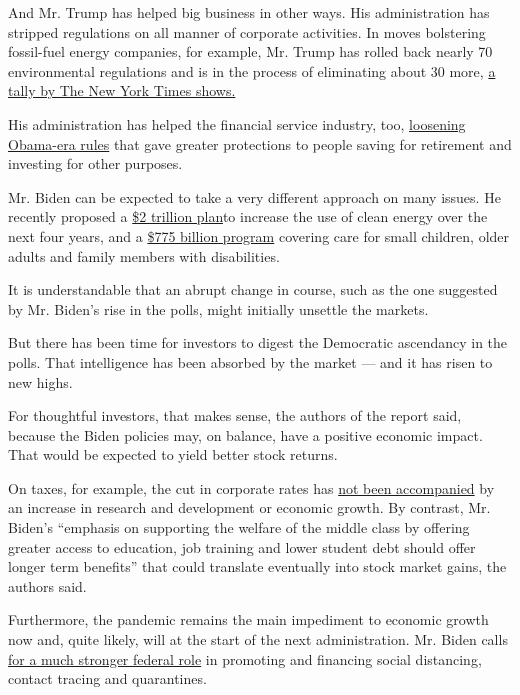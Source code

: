 And Mr. Trump has helped big business in other ways. His administration
has stripped regulations on all manner of corporate activities. In moves
bolstering fossil-fuel energy companies, for example, Mr. Trump has
rolled back nearly 70 environmental regulations and is in the process of
eliminating about 30 more,
\href{https://www.nytimes.com/interactive/2020/climate/trump-environment-rollbacks.html}{a
tally by The New York Times shows.}

His administration has helped the financial service industry, too,
\href{https://www.nytimes.com/2020/07/16/your-money/fiduciary-duty-investments-best-interest.html}{loosening
Obama-era rules} that gave greater protections to people saving for
retirement and investing for other purposes.

Mr. Biden can be expected to take a very different approach on many
issues. He recently proposed a
\href{https://www.nytimes.com/2020/07/14/us/politics/biden-climate-plan.html}{\$2
trillion plan}to increase the use of clean energy over the next four
years, and a
\href{https://www.nytimes.com/2020/07/21/us/politics/biden-workplace-childcare.html}{\$775
billion program} covering care for small children, older adults and
family members with disabilities.

It is understandable that an abrupt change in course, such as the one
suggested by Mr. Biden's rise in the polls, might initially unsettle the
markets.

But there has been time for investors to digest the Democratic
ascendancy in the polls. That intelligence has been absorbed by the
market --- and it has risen to new highs.

For thoughtful investors, that makes sense, the authors of the report
said, because the Biden policies may, on balance, have a positive
economic impact. That would be expected to yield better stock returns.

On taxes, for example, the cut in corporate rates has
\href{https://www.nytimes.com/2018/11/12/business/economy/trumps-tax-cut-was-supposed-to-change-corporate-behavior-heres-what-happened.html}{not
been accompanied} by an increase in research and development or economic
growth. By contrast, Mr. Biden's ``emphasis on supporting the welfare of
the middle class by offering greater access to education, job training
and lower student debt should offer longer term benefits'' that could
translate eventually into stock market gains, the authors said.

Furthermore, the pandemic remains the main impediment to economic growth
now and, quite likely, will at the start of the next administration. Mr.
Biden calls
\href{https://www.nytimes.com/2020/05/28/us/politics/biden-trump-coronavirus-testing.html}{for
a much stronger federal role} in promoting and financing social
distancing, contact tracing and quarantines.

